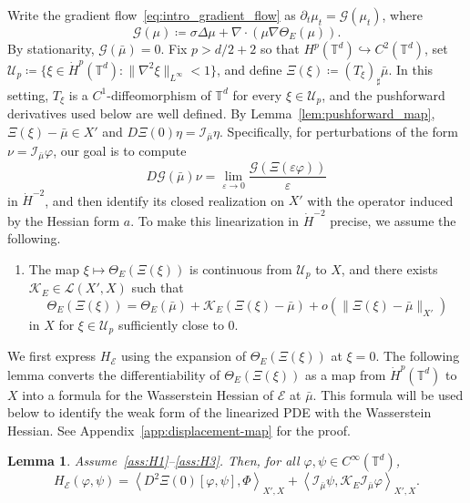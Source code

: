 \documentclass[11pt]{article}
\numberwithin{equation}{section}
\newtheorem{lemma}[theorem]{Lemma}
\theoremstyle{definition}
\newcommand{\T}{\mathbb{T}}
\newcommand{\E}{\mathcal{E}}
\newcommand{\rieszmap}[1][\mu]{\mathcal{I}_{#1}}
\newcommand{\dotHk}[1][k]{\dot{H}^{#1}}
\begin{document}
Write the gradient flow~\eqref{eq:intro_gradient_flow} as $\partial_t \mu_t = \mathcal{G}(\mu_t)$, where 
\[
\mathcal{G}(\mu) \coloneqq \sigma\Delta\mu + \nabla\cdot(\mu\nabla\Theta_E(\mu)).
\] 
By stationarity, $\mathcal{G}(\bar\mu) = 0$.
Fix $p > d/2 + 2$ so that $H^p(\T^d) \hookrightarrow C^2(\T^d)$, set $\mathcal{U}_p \coloneqq \{\xi \in \dotHk[p](\T^d) : \|\nabla^2\xi\|_{L^\infty} < 1\}$, and define $\Xi(\xi) \coloneqq (T_\xi)_{\sharp}\bar\mu$.
In this setting, $T_\xi$ is a $C^1$-diffeomorphism of $\T^d$ for every $\xi \in \mathcal{U}_p$, and the pushforward derivatives used below are well defined.
By Lemma~\ref{lem:pushforward_map}, $\Xi(\xi) - \bar\mu \in X'$ and $D\Xi(0)\eta = \rieszmap[\bar\mu]\eta$.
Specifically, for perturbations of the form $\nu = \rieszmap[\bar\mu]\varphi$, our goal is to compute
\[
D\mathcal{G}(\bar\mu)\nu = \lim_{\varepsilon \to 0} \frac{\mathcal{G}(\Xi(\varepsilon\varphi))}{\varepsilon}
\]
in $\dot{H}^{-2}$, and then identify its closed realization on $X'$ with the operator induced by the Hessian form $a$.
To make this linearization in $\dot{H}^{-2}$ precise, we assume the following.

\begin{enumerate}[label=(H\arabic*),ref=(H\arabic*),start=3]
    \item\label{ass:H3} The map $\xi \mapsto \Theta_E(\Xi(\xi))$ is continuous from $\mathcal{U}_p$ to $X$, and there exists $\mathcal{K}_E \in \mathcal{L}(X', X)$ such that
    \[
    \Theta_E(\Xi(\xi)) = \Theta_E(\bar\mu) + \mathcal{K}_E(\Xi(\xi)-\bar\mu) + o(\|\Xi(\xi)-\bar\mu\|_{X'})
    \]
    in $X$ for $\xi \in \mathcal{U}_p$ sufficiently close to $0$.
\end{enumerate}

We first express $H_\E$ using the expansion of $\Theta_E(\Xi(\xi))$ at $\xi = 0$. 
The following lemma converts the differentiability of $\Theta_E(\Xi(\xi))$ as a map from $\dotHk[p](\T^d)$ to $X$ into a formula for the Wasserstein Hessian of $\E$ at $\bar\mu$. 
This formula will be used below to identify the weak form of the linearized PDE with the Wasserstein Hessian.
See Appendix~\ref{app:displacement-map} for the proof.

\begin{lemma}
    \label{lem:second_variation_pushforward}
    Assume~\ref{ass:H1}--\ref{ass:H3}.
    Then, for all $\varphi, \psi\in C^\infty(\T^d)$,
    \[
    H_\E(\varphi,\psi)=\left\langle D^2\Xi(0)[\varphi,\psi], \Phi \right\rangle_{X',X} + \left\langle \rieszmap[\bar\mu]\psi, \mathcal{K}_E \rieszmap[\bar\mu]\varphi \right \rangle_{X',X}.
    \]
\end{lemma}
\end{document}
